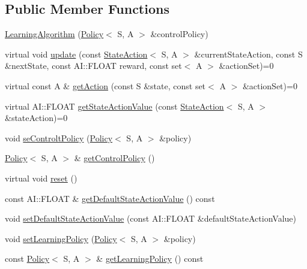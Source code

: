 \subsection*{Public Member Functions}
\begin{DoxyCompactItemize}
\item 
\hyperlink{classAI_1_1Algorithm_1_1LearningAlgorithm_af49f907f3042d07c541e883cb8edd9f8}{Learning\-Algorithm} (\hyperlink{classAI_1_1Algorithm_1_1Policy}{Policy}$<$ S, A $>$ \&control\-Policy)
\item 
virtual void \hyperlink{classAI_1_1Algorithm_1_1LearningAlgorithm_a7d216d791e558e15a73083af6257ed72}{update} (const \hyperlink{classAI_1_1StateAction}{State\-Action}$<$ S, A $>$ \&current\-State\-Action, const S \&next\-State, const A\-I\-::\-F\-L\-O\-A\-T reward, const set$<$ A $>$ \&action\-Set)=0
\item 
virtual const A \& \hyperlink{classAI_1_1Algorithm_1_1LearningAlgorithm_afeca4eded9bc0a02312ccbbfd05f8daa}{get\-Action} (const S \&state, const set$<$ A $>$ \&action\-Set)=0
\item 
virtual A\-I\-::\-F\-L\-O\-A\-T \hyperlink{classAI_1_1Algorithm_1_1LearningAlgorithm_a1044b2558109e8dd3d3bf5bedb9723b5}{get\-State\-Action\-Value} (const \hyperlink{classAI_1_1StateAction}{State\-Action}$<$ S, A $>$ \&state\-Action)=0
\item 
void \hyperlink{classAI_1_1Algorithm_1_1LearningAlgorithm_a91df9fe0a6f2aa33de05c02724dda01b}{se\-Controlt\-Policy} (\hyperlink{classAI_1_1Algorithm_1_1Policy}{Policy}$<$ S, A $>$ \&policy)
\item 
\hyperlink{classAI_1_1Algorithm_1_1Policy}{Policy}$<$ S, A $>$ \& \hyperlink{classAI_1_1Algorithm_1_1LearningAlgorithm_a72c258f85d7e8d4c4006eefd15d88d44}{get\-Control\-Policy} ()
\item 
virtual void \hyperlink{classAI_1_1Algorithm_1_1LearningAlgorithm_aebe650b79f39ffd46ece7adb44ddaf60}{reset} ()
\item 
const A\-I\-::\-F\-L\-O\-A\-T \& \hyperlink{classAI_1_1Algorithm_1_1LearningAlgorithm_aafc85fe7b2ad9331ae41593784321641}{get\-Default\-State\-Action\-Value} () const 
\item 
void \hyperlink{classAI_1_1Algorithm_1_1LearningAlgorithm_a1da99bfa2de96f397a4ef07e53ab5697}{set\-Default\-State\-Action\-Value} (const A\-I\-::\-F\-L\-O\-A\-T \&default\-State\-Action\-Value)
\item 
void \hyperlink{classAI_1_1Algorithm_1_1LearningAlgorithm_aca50977412a978c428af7ea3ae73f50b}{set\-Learning\-Policy} (\hyperlink{classAI_1_1Algorithm_1_1Policy}{Policy}$<$ S, A $>$ \&policy)
\item 
const \hyperlink{classAI_1_1Algorithm_1_1Policy}{Policy}$<$ S, A $>$ \& \hyperlink{classAI_1_1Algorithm_1_1LearningAlgorithm_acc959d1d4f846b96f7537c33d78b52b4}{get\-Learning\-Policy} () const 
\end{DoxyCompactItemize}
